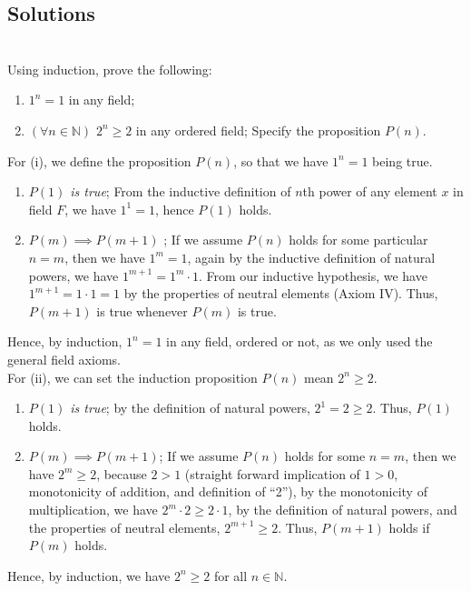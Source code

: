 \documentclass[12pt]{book}
\newcommand{\N}{\mathbb{N}}
\theoremstyle{definition}
\begin{document}

\subsection{Solutions}

\begin{ex}[1]
\\
Using induction, prove the following:
\begin{enumerate}[label= (\roman*)]
	\item $1^n=1$ in any field;
	\item $(\forall n \in \N)$ $2^n\geq 2$ in any ordered field; Specify the proposition $P(n)$. 
\end{enumerate} 
\end{ex}
\begin{sol}
For (i), we define the proposition $P(n)$, so that we have $1^n =1$ being true. 
\begin{enumerate}[label = (\roman*)$'$]
	\item \textit{$P(1)$ is true}; From the inductive definition of $n$th power of any element $x$ in field $F$, we have $1^1= 1$, hence $P(1)$ holds.
	\item $P(m)\implies P(m+1)$ ; If we assume $P(n)$ holds for some particular $n=m$, then we have $1^m =1$, again by the inductive definition of natural powers, we have $1^{m+1} = 1^m \cdot 1$. From our inductive hypothesis, we have $1^{m+1}=1 \cdot 1 =1$ by the properties of neutral elements (Axiom IV). Thus, $P(m+1)$ is true whenever $P(m)$ is true.   
\end{enumerate}

\indent Hence, by induction, $1^n =1$ in any field, ordered or not, as we only used the general field axioms.\\
\indent For  (ii), we can set the induction proposition $P(n)$ mean $2^n \geq 2$. 
\begin{enumerate}[label = (\roman*)$'$]
	\item \textit{$P(1)$ is true}; by the definition of natural powers, $2^1=2 \geq 2$. Thus, $P(1)$ holds.
	\item $P(m)\implies P(m+1)$; If we assume $P(n)$ holds for some $n=m$, then we have $2^m \geq 2$, because $2>1$ (straight forward implication of $1>0$, monotonicity of addition, and definition of ``2''), by the monotonicity of multiplication, we have $2^m \cdot 2 \geq 2 \cdot 1$, by the definition of natural powers, and the properties of neutral elements, $2^{m+1}\geq 2$. Thus, $P(m+1)$ holds if $P(m)$ holds.
\end{enumerate}
Hence, by induction, we have $2^n\geq 2$ for all $n \in \N$.
\end{sol}
\end{document}
